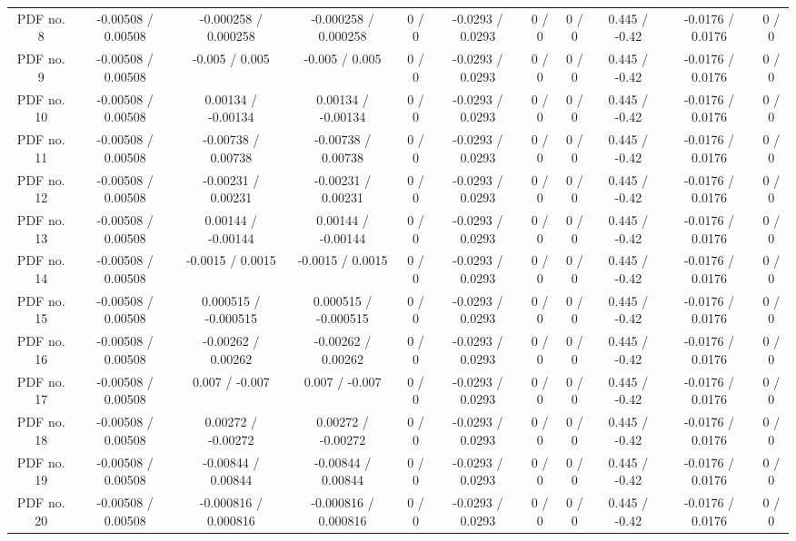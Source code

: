 \begin{table}[htbp]
\begin{center}
\begin{tabular}{|c|c|c|c|c|c|c|c|c|c|c|}
  PDF no. 8 & -0.00508 / 0.00508 & -0.000258 / 0.000258 & -0.000258 / 0.000258 & 0 / 0 & -0.0293 / 0.0293 & 0 / 0 & 0 / 0 & 0.445 / -0.42 & -0.0176 / 0.0176 & 0 / 0 \\ 
  PDF no. 9 & -0.00508 / 0.00508 & -0.005 / 0.005 & -0.005 / 0.005 & 0 / 0 & -0.0293 / 0.0293 & 0 / 0 & 0 / 0 & 0.445 / -0.42 & -0.0176 / 0.0176 & 0 / 0 \\ 
  PDF no. 10 & -0.00508 / 0.00508 & 0.00134 / -0.00134 & 0.00134 / -0.00134 & 0 / 0 & -0.0293 / 0.0293 & 0 / 0 & 0 / 0 & 0.445 / -0.42 & -0.0176 / 0.0176 & 0 / 0 \\ 
  PDF no. 11 & -0.00508 / 0.00508 & -0.00738 / 0.00738 & -0.00738 / 0.00738 & 0 / 0 & -0.0293 / 0.0293 & 0 / 0 & 0 / 0 & 0.445 / -0.42 & -0.0176 / 0.0176 & 0 / 0 \\ 
  PDF no. 12 & -0.00508 / 0.00508 & -0.00231 / 0.00231 & -0.00231 / 0.00231 & 0 / 0 & -0.0293 / 0.0293 & 0 / 0 & 0 / 0 & 0.445 / -0.42 & -0.0176 / 0.0176 & 0 / 0 \\ 
  PDF no. 13 & -0.00508 / 0.00508 & 0.00144 / -0.00144 & 0.00144 / -0.00144 & 0 / 0 & -0.0293 / 0.0293 & 0 / 0 & 0 / 0 & 0.445 / -0.42 & -0.0176 / 0.0176 & 0 / 0 \\ 
  PDF no. 14 & -0.00508 / 0.00508 & -0.0015 / 0.0015 & -0.0015 / 0.0015 & 0 / 0 & -0.0293 / 0.0293 & 0 / 0 & 0 / 0 & 0.445 / -0.42 & -0.0176 / 0.0176 & 0 / 0 \\ 
  PDF no. 15 & -0.00508 / 0.00508 & 0.000515 / -0.000515 & 0.000515 / -0.000515 & 0 / 0 & -0.0293 / 0.0293 & 0 / 0 & 0 / 0 & 0.445 / -0.42 & -0.0176 / 0.0176 & 0 / 0 \\ 
  PDF no. 16 & -0.00508 / 0.00508 & -0.00262 / 0.00262 & -0.00262 / 0.00262 & 0 / 0 & -0.0293 / 0.0293 & 0 / 0 & 0 / 0 & 0.445 / -0.42 & -0.0176 / 0.0176 & 0 / 0 \\ 
  PDF no. 17 & -0.00508 / 0.00508 & 0.007 / -0.007 & 0.007 / -0.007 & 0 / 0 & -0.0293 / 0.0293 & 0 / 0 & 0 / 0 & 0.445 / -0.42 & -0.0176 / 0.0176 & 0 / 0 \\ 
  PDF no. 18 & -0.00508 / 0.00508 & 0.00272 / -0.00272 & 0.00272 / -0.00272 & 0 / 0 & -0.0293 / 0.0293 & 0 / 0 & 0 / 0 & 0.445 / -0.42 & -0.0176 / 0.0176 & 0 / 0 \\ 
  PDF no. 19 & -0.00508 / 0.00508 & -0.00844 / 0.00844 & -0.00844 / 0.00844 & 0 / 0 & -0.0293 / 0.0293 & 0 / 0 & 0 / 0 & 0.445 / -0.42 & -0.0176 / 0.0176 & 0 / 0 \\ 
  PDF no. 20 & -0.00508 / 0.00508 & -0.000816 / 0.000816 & -0.000816 / 0.000816 & 0 / 0 & -0.0293 / 0.0293 & 0 / 0 & 0 / 0 & 0.445 / -0.42 & -0.0176 / 0.0176 & 0 / 0 \\ 

\end{tabular}
\end{center}
\end{table}
